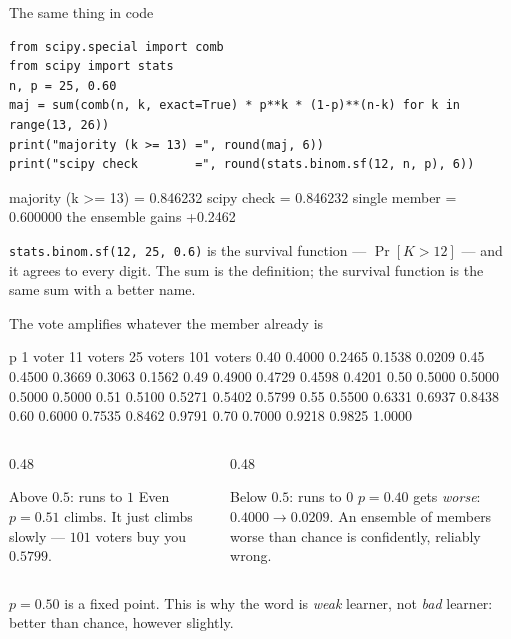 \documentclass[aspectratio=169]{beamer}
\begin{document}
\begin{frame}[fragile,shrink=5]{The same thing in code}
\begin{lstlisting}
from scipy.special import comb
from scipy import stats
n, p = 25, 0.60
maj = sum(comb(n, k, exact=True) * p**k * (1-p)**(n-k) for k in range(13, 26))
print("majority (k >= 13) =", round(maj, 6))
print("scipy check        =", round(stats.binom.sf(12, n, p), 6))
\end{lstlisting}
\begin{outblk}
majority (k >= 13) = 0.846232
scipy check        = 0.846232
single member      = 0.600000
the ensemble gains   +0.2462
\end{outblk}
  \begin{center}\small
    \texttt{stats.binom.sf(12, 25, 0.6)} is the survival function ---
    $\Pr[K > 12]$ --- and it agrees to every digit. The sum is the definition;
    the survival function is the same sum with a better name.
  \end{center}
\end{frame}

\begin{frame}[fragile,shrink=4]{The vote amplifies whatever the member already is}
\begin{outblk}
 p      1 voter    11 voters   25 voters  101 voters
0.40      0.4000      0.2465      0.1538      0.0209
0.45      0.4500      0.3669      0.3063      0.1562
0.49      0.4900      0.4729      0.4598      0.4201
0.50      0.5000      0.5000      0.5000      0.5000
0.51      0.5100      0.5271      0.5402      0.5799
0.55      0.5500      0.6331      0.6937      0.8438
0.60      0.6000      0.7535      0.8462      0.9791
0.70      0.7000      0.9218      0.9825      1.0000
\end{outblk}
  \begin{columns}[T]
    \begin{column}{0.48\textwidth}
      \begin{block}{Above $0.5$: runs to $1$}
        Even $p = 0.51$ climbs. It just climbs slowly --- $101$ voters buy
        you $0.5799$.
      \end{block}
    \end{column}
    \begin{column}{0.48\textwidth}
      \begin{alertblock}{Below $0.5$: runs to $0$}
        $p = 0.40$ gets \emph{worse}: $0.4000 \to 0.0209$. An ensemble of
        members worse than chance is confidently, reliably wrong.
      \end{alertblock}
    \end{column}
  \end{columns}
  \begin{center}\small
    $p = 0.50$ is a fixed point. This is why the word is \emph{weak} learner,
    not \emph{bad} learner: better than chance, however slightly.
  \end{center}
\end{frame}
\end{document}
